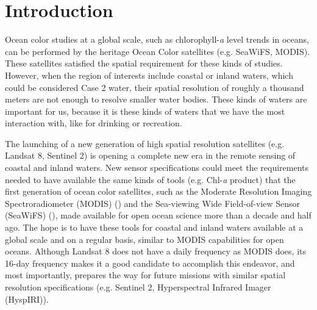 \chapter{Introduction}
\label{ch:introduction} 


Ocean color studies at a global scale, such as chlorophyll-{\it a} level trends in oceans, can be performed by the heritage Ocean Color satellites (e.g. SeaWiFS, MODIS). These satellites satisfied the spatial requirement for these kinds of studies. However, when the region of interests include coastal or inland waters, which could be considered Case 2 water, their spatial resolution of roughly a thousand meters are not enough to resolve smaller water bodies. These kinds of waters are important for us, because it is these kinds of waters that we have the most interaction with, like for drinking or recreation. 

The launching of a new generation of high spatial resolution satellites (e.g. Landsat 8, Sentinel 2) is opening a complete new era in the remote sensing of coastal and inland waters. New sensor specifications could meet the requirements needed to have available the same kinds of tools (e.g. Chl-{\it a} product) that the first generation of ocean color satellites, such as the Moderate Resolution Imaging Spectroradiometer (MODIS) (\cite{Esaias1998}) and the Sea-viewing Wide Field-of-view Sensor (SeaWiFS) (\cite{McClain2004}), made available for open ocean science more than a decade and half ago. The hope is to have these tools for coastal and inland waters available at a global scale and on a regular basis, similar to MODIS capabilities for open oceans. Although Landsat 8 does not have a daily frequency as MODIS does, its 16-day frequency makes it a good candidate to accomplish this endeavor, and most importantly, prepares the way for future missions with similar spatial resolution specifications (e.g. Sentinel 2, Hyperspectral Infrared Imager (HyspIRI)).

